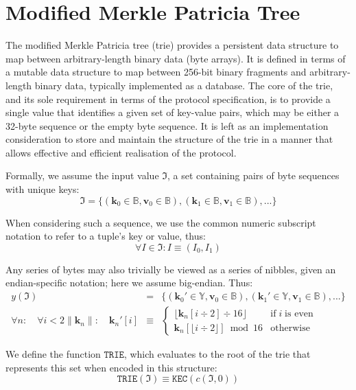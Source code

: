 \documentclass[9pt,oneside]{amsart}
\begin{document}
\section{Modified Merkle Patricia Tree}\label{app:trie}\hypertarget{trie}{}
The modified Merkle Patricia tree (trie) provides a persistent data structure to map between arbitrary-length binary data (byte arrays). It is defined in terms of a mutable data structure to map between 256-bit binary fragments and arbitrary-length binary data, typically implemented as a database. The core of the trie, and its sole requirement in terms of the protocol specification, is to provide a single value that identifies a given set of key-value pairs, which may be either a 32-byte sequence or the empty byte sequence. It is left as an implementation consideration to store and maintain the structure of the trie in a manner that allows effective and efficient realisation of the protocol.

Formally, we assume the input value $\mathfrak{I}$, a set containing pairs of byte sequences with unique keys:
\begin{equation}
\mathfrak{I} = \{ (\mathbf{k}_0 \in \mathbb{B}, \mathbf{v}_0 \in \mathbb{B}), (\mathbf{k}_1 \in \mathbb{B}, \mathbf{v}_1 \in \mathbb{B}), ... \}
\end{equation}

When considering such a sequence, we use the common numeric subscript notation to refer to a tuple's key or value, thus:
\begin{equation}
\forall I \in \mathfrak{I}: I \equiv (I_0, I_1)
\end{equation}

Any series of bytes may also trivially be viewed as a series of nibbles, given an endian-specific notation; here we assume big-endian. Thus:
\begin{eqnarray}
y(\mathfrak{I}) & = & \{ (\mathbf{k}_0' \in \mathbb{Y}, \mathbf{v}_0 \in \mathbb{B}), (\mathbf{k}_1' \in \mathbb{Y}, \mathbf{v}_1 \in \mathbb{B}), ... \} \\
\forall n: \quad \forall i < 2\lVert\mathbf{k}_{n}\rVert: \quad \mathbf{k}_{n}'[i] & \equiv &
\begin{cases}
\lfloor \mathbf{k}_{n}[i \div 2] \div 16 \rfloor & \text{if} \; i \; \text{is even} \\
\mathbf{k}_{n}[\lfloor i \div 2 \rfloor] \bmod 16 & \text{otherwise}
\end{cases}
\end{eqnarray}

We define the function $\texttt{TRIE}$, which evaluates to the root of the trie that represents this set when encoded in this structure:
\begin{equation}
\texttt{TRIE}(\mathfrak{I}) \equiv \texttt{KEC}(c(\mathfrak{I}, 0))
\end{equation}
\end{document}
